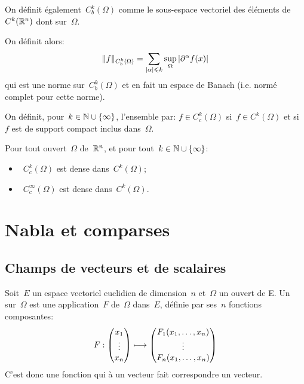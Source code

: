 On définit également~$C^k_b(\Omega)$ comme le sous-espace vectoriel des éléments de~$C^k(\mathbb R^n)$ dont  sur~$\Omega$.

On définit alors:
\begin{equation}
\|f\|_{C^k_b(\Omega)}=\displaystyle\sum_{|\alpha|\leqslant k} \sup_{\Omega} |\partial^\alpha f(x)|
\end{equation}
qui est une norme sur~$C^k_b(\Omega)$ et en fait un espace de Banach (i.e. normé complet pour cette norme).

\medskip
\begin{definition}\label{Def-Cc}
On définit, pour~$k\in\mathbb N\cup\{\infty\}$, l'ensemble  par:
$f\in C_c^k(\Omega)$ si~$f\in C^k(\Omega)$ et si~$f$ est de support compact inclus dans~$\Omega$.
\end{definition}
Pour tout ouvert~$\Omega$ de~$\mathbb R^n$, et pour tout~$k\in\mathbb N\cup\{\infty\}$:
\begin{itemize}
  \item~$C_c^k(\Omega)$ est dense dans~$C^k(\Omega)$;
  \item~$C_c^\infty(\Omega)$ est dense dans~$C^k(\Omega)$.
\end{itemize}

\medskip
\section{Nabla et comparses}\label{Sec-nabla}

\subsection{Champs de vecteurs et de scalaires}

\begin{definition}
Soit~$E$ un espace vectoriel euclidien de dimension~$n$ et~$\Omega$ un ouvert de E.
Un  sur~$\Omega$ est une application~$F$ de~$\Omega$ dans~$E$, définie par ses~$n$ fonctions composantes:
\begin{equation}
  F: \VV*{x_1\\\vdots\\x_n} \longmapsto \VV*{F_1(x_1,\dots,x_n)\\ \vdots\\ F_n(x_1,\dots,x_n)}
\end{equation}
C'est donc une fonction qui à un vecteur fait correspondre un vecteur.
\end{definition}


